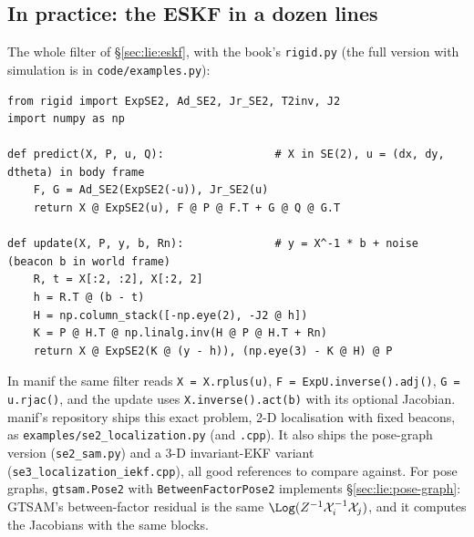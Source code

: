 \subsection{In practice: the ESKF in a dozen lines}\label{sec:lie:robotics-in-practice}

The whole filter of \S\ref{sec:lie:eskf}, with the book's \texttt{rigid.py} (the full version with simulation is in \texttt{code/examples.py}):
\begin{verbatim}
from rigid import ExpSE2, Ad_SE2, Jr_SE2, T2inv, J2
import numpy as np

def predict(X, P, u, Q):                 # X in SE(2), u = (dx, dy, dtheta) in body frame
    F, G = Ad_SE2(ExpSE2(-u)), Jr_SE2(u)
    return X @ ExpSE2(u), F @ P @ F.T + G @ Q @ G.T

def update(X, P, y, b, Rn):              # y = X^-1 * b + noise  (beacon b in world frame)
    R, t = X[:2, :2], X[:2, 2]
    h = R.T @ (b - t)
    H = np.column_stack([-np.eye(2), -J2 @ h])
    K = P @ H.T @ np.linalg.inv(H @ P @ H.T + Rn)
    return X @ ExpSE2(K @ (y - h)), (np.eye(3) - K @ H) @ P
\end{verbatim}
In manif the same filter reads \texttt{X = X.rplus(u)}, \texttt{F = ExpU.inverse().adj()}, \texttt{G = u.rjac()}, and the update uses \texttt{X.inverse().act(b)} with its optional Jacobian. manif's repository ships this exact problem, 2-D localisation with fixed beacons, as \texttt{examples/se2\_localization.py} (and \texttt{.cpp}). It also ships the pose-graph version (\texttt{se2\_sam.py}) and a 3-D invariant-EKF variant (\texttt{se3\_localization\_iekf.cpp}), all good references to compare against. For pose graphs, \texttt{gtsam.Pose2} with \texttt{BetweenFactorPose2} implements \S\ref{sec:lie:pose-graph}: GTSAM's between-factor residual is the same $\Log(Z^{-1}\mathcal X_i^{-1}\mathcal X_j)$, and it computes the Jacobians with the same blocks.
